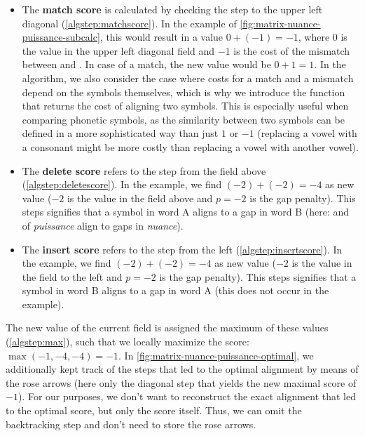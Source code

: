 
\begin{itemize}[leftmargin=0cm]

    \item The \textbf{match score} is calculated by checking the step to the upper left diagonal (\autoref{algstep:matchscore}). In the example of \autoref{fig:matrix-nuance-puissance-subcalc}, this would result in a value $0+(-1) = -1$, where $0$ is the value in the upper left diagonal field and $-1$ is the cost of the mismatch between  and . In case of a match, the new value would be $0 + 1 = 1$. In the algorithm, we also consider the case where costs for a match and a mismatch depend on the symbols themselves, which is why we introduce the function  that returns the cost of aligning two symbols. This is especially useful when comparing phonetic symbols, as the similarity between two symbols can be defined in a more sophisticated way than just $1$ or $-1$ (\eg replacing a vowel with a consonant might be more costly than replacing a vowel with another vowel).
    
    \item The \textbf{delete score} refers to the step from the field above (\autoref{algstep:deletescore}). In the example, we find $(-2) + (-2) = -4$ as new value ($-2$ is the value in the field above and $p=-2$ is the gap penalty). This steps signifies that a symbol in word A aligns to a gap in word B (here:  and  of \textit{puissance} align to gaps in \textit{nuance}).
    
    \item The \textbf{insert score} refers to the step from the left (\autoref{algstep:insertscore}). In the example, we find $(-2) + (-2) = -4$ as new value ($-2$ is the value in the field to the left and $p=-2$ is the gap penalty). This steps signifies that a symbol in word B aligns to a gap in word A (this does not occur in the example).

\end{itemize}

The new value of the current field is assigned the maximum of these values (\autoref{algstep:max}), such that we locally maximize the score: $\max(-1, -4, -4) = -1$. In \autoref{fig:matrix-nuance-puissance-optimal}, we additionally kept track of the steps that led to the optimal alignment by means of the rose arrows (here only the diagonal step that yields the new maximal score of $-1$). For our purposes, we don't want to reconstruct the exact alignment that led to the optimal score, but only the score itself. Thus, we can omit the backtracking step and don't need to store the rose arrows.


